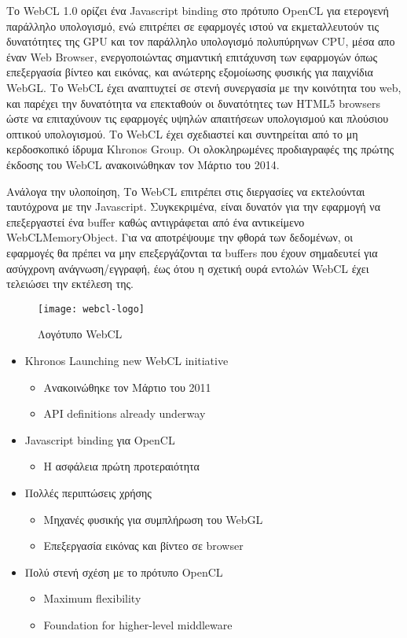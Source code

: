Το WebCL 1.0 ορίζει ένα Javascript binding στο πρότυπο OpenCL για ετερογενή παράλληλο υπολογισμό, ενώ επιτρέπει σε εφαρμογές ιστού να εκμεταλλευτούν τις δυνατότητες της GPU και τον παράλληλο υπολογισμό πολυπύρηνων CPU, μέσα απο έναν Web Browser, ενεργοποιώντας σημαντική επιτάχυνση των εφαρμογών όπως επεξεργασία βίντεο και εικόνας, και ανώτερης εξομοίωσης φυσικής για παιχνίδια WebGL. Το WebCL έχει αναπτυχτεί σε στενή συνεργασία με την κοινότητα του web, και παρέχει την δυνατότητα να επεκταθούν οι δυνατότητες των HTML5 browsers ώστε να επιταχύνουν τις εφαρμογές υψηλών απαιτήσεων υπολογισμού και πλούσιου οπτικού υπολογισμού. Το WebCL έχει σχεδιαστεί και συντηρείται από το μη κερδοσκοπικό ίδρυμα Khronos Group. Οι ολοκληρωμένες προδιαγραφές της πρώτης έκδοσης του WebCL ανακοινώθηκαν τον Μάρτιο του 2014.

Ανάλογα την υλοποίηση, Το WebCL επιτρέπει στις διεργασίες να εκτελούνται ταυτόχρονα με την Javascript. Συγκεκριμένα, είναι δυνατόν για την εφαρμογή να επεξεργαστεί ένα buffer καθώς αντιγράφεται από ένα αντικείμενο WebCLMemoryObject. Για να αποτρέψουμε την φθορά των δεδομένων, οι εφαρμογές θα πρέπει να μην επεξεργάζονται τα buffers που έχουν σημαδευτεί για ασύγχρονη ανάγνωση/εγγραφή, έως ότου η σχετική ουρά εντολών WebCL έχει τελειώσει την εκτέλεση της.

\begin{figure}[h]
	\texttt{[image: webcl-logo]}
	\centering
	\caption{Λογότυπο WebCL}
\end{figure}
\begin{itemize}
\item Khronos Launching new WebCL initiative
	\begin{itemize}
	\item Ανακοινώθηκε τον Μάρτιο του 2011
	\item API definitions already underway
	\end{itemize}
\item Javascript binding για OpenCL
	\begin{itemize}
	\item Η ασφάλεια πρώτη προτεραιότητα
	\end{itemize}
\item Πολλές περιπτώσεις χρήσης
	\begin{itemize}
	\item Μηχανές φυσικής για συμπλήρωση του WebGL
	\item Επεξεργασία εικόνας και βίντεο σε browser
	\end{itemize}
\item Πολύ στενή σχέση με το πρότυπο OpenCL
	\begin{itemize}
	\item Maximum flexibility
	\item Foundation for higher-level middleware
	\end{itemize}
\end{itemize}


